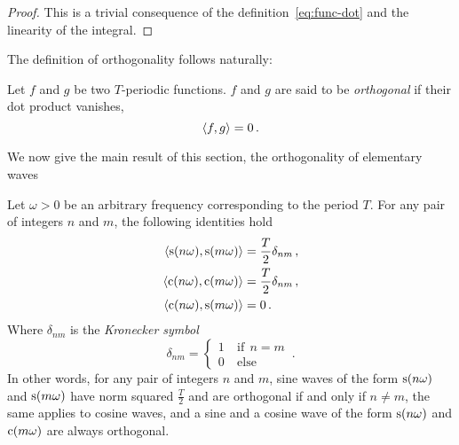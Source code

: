 \begin{proof}
  This is a trivial consequence of the definition~\cref{eq:func-dot} and the linearity of
  the integral.
\end{proof}
The definition of orthogonality follows naturally:
\begin{definition}
  \label{def:dot-rfunc}
  Let $f$ and $g$ be two $T$-periodic functions. $f$ and $g$ are said to be
  \emph{orthogonal} if their dot product vanishes, \ie
  \begin{equation}
    \braket{f,g}=0\,.
  \end{equation}
\end{definition}
We now give the main result of this section, \ie the orthogonality of elementary waves
\begin{theorem}
  \label{thm:sc-orth}
  Let $\omega>0$ be an arbitrary frequency corresponding to the period $T$. For any pair
  of integers $n$ and $m$, the following identities hold
  \begin{align}
    \braket{\mathrm{s}(n\omega),\mathrm{s}(m\omega)}&=\frac{T}{2}\delta_{nm}\,,\label{eq:sw-orth}\\
    \braket{\mathrm{c}(n\omega),\mathrm{c}(m\omega)}&=\frac{T}{2}\delta_{nm}\,,\label{eq:cw-orth}\\
    \braket{\mathrm{c}(n\omega),\mathrm{s}(m\omega)}&=0\,.\label{eq:scw-orth}
  \end{align}
  Where $\delta_{nm}$ is the \emph{Kronecker symbol}
  \begin{equation}
    \delta_{nm}=
    \begin{cases}
      1&~\mathrm{if}~~n=m\\
      0&~\mathrm{else}
    \end{cases}\,.
  \end{equation}
  In other words, for any pair of integers $n$ and $m$, sine waves of the form
  $\mathrm{s}(n\omega)$ and $\mathrm{s}(m\omega)$ have norm squared $\frac{T}{2}$ and are orthogonal if
  and only if $n\neq m$, the same applies to cosine waves, and a sine and a cosine wave of
  the form $\mathrm{s}(n\omega)$ and $\mathrm{c}(m\omega)$ are always orthogonal.
\end{theorem}
